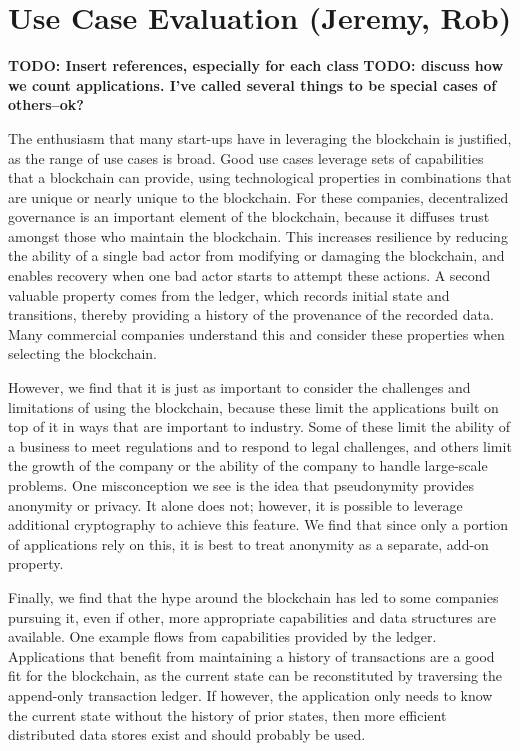
\section{Use Case Evaluation (Jeremy, Rob)}

\textbf{TODO: Insert references, especially for each class}
\textbf{TODO: discuss how we count applications.  I've called several things to be special cases of others--ok?}

The enthusiasm that many start-ups have in leveraging the blockchain is justified, as the range of use cases is broad.  Good use cases leverage sets of capabilities that a blockchain can provide, using technological properties in combinations that are unique or nearly unique to the blockchain.  For these companies, decentralized governance is an important element of the blockchain, because it diffuses trust amongst those who maintain the blockchain.  This increases resilience by reducing the ability of a single bad actor from modifying or damaging the blockchain, and enables recovery when one bad actor starts to attempt these actions.  A second valuable property comes from the ledger, which records initial state and transitions, thereby providing a history of the provenance of the recorded data.  Many commercial companies understand this and consider these properties when selecting the blockchain.  

However, we find that it is just as important to consider the challenges and limitations of using the blockchain, because these limit the applications built on top of it in ways that are important to industry.  Some of these limit the ability of a business to meet regulations and to respond to legal challenges, and others limit the growth of the company or the ability of the company to handle large-scale problems.  One misconception we see is the idea that pseudonymity provides anonymity or privacy.  It alone does not; however, it is possible to leverage additional cryptography to achieve this feature.  We find that since only a portion of applications rely on this, it is best to treat anonymity as a separate, add-on property.

Finally, we find that the hype around the blockchain has led to some companies pursuing it, even if other, more appropriate capabilities and data structures are available.  One example flows from capabilities provided by the ledger.  Applications that benefit from maintaining a history of transactions are a good fit for the blockchain, as the current state can be reconstituted by traversing the append-only transaction ledger.  If however, the application only needs to know the current state without the history of prior states, then more efficient distributed data stores exist and should probably be used.

